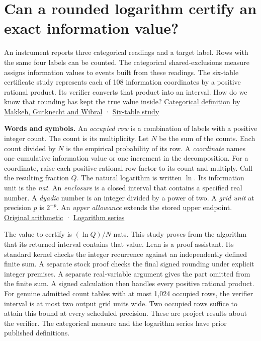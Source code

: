 \section{Can a rounded logarithm certify an exact information value?}\label{can-a-rounded-logarithm-certify-an-exact-information-value}

An instrument reports three categorical readings and a target label. Rows with the same four labels can be counted. The categorical shared-exclusions measure assigns information values to events built from these readings. The six-table certificate study represents each of 108 information coordinates by a positive rational product. Its verifier converts that product into an interval. How do we know that rounding has kept the true value inside? \href{https://doi.org/10.1103/PhysRevE.103.032149}{Categorical definition by Makkeh, Gutknecht and Wibral} · \href{https://github.com/sepahead/pid-rs/blob/main/audit/research/three-source-six-certificate-observations/README.md}{Six-table study}

\textbf{Words and symbols.} An \emph{occupied row} is a combination of labels with a positive integer count. The count is its multiplicity. Let \(N\) be the sum of the counts. Each count divided by \(N\) is the empirical probability of its row. A \emph{coordinate} names one cumulative information value or one increment in the decomposition. For a coordinate, raise each positive rational row factor to its count and multiply. Call the resulting fraction \(Q\). The natural logarithm is written \(\ln\). Its information unit is the \emph{nat}. An \emph{enclosure} is a closed interval that contains a specified real number. A \emph{dyadic} number is an integer divided by a power of two. A \emph{grid unit} at precision \(p\) is \(2^{-p}\). An \emph{upper allowance} extends the stored upper endpoint. \href{https://github.com/sepahead/pid-rs/blob/main/audit/research/three-source-six-certificate-observations/arithmetic.py}{Original arithmetic} · \href{https://dlmf.nist.gov/4.6.E4}{Logarithm series}

The value to certify is \((\ln Q)/N\) nats. This study proves from the algorithm that its returned interval contains that value. Lean is a proof assistant. Its standard kernel checks the integer recurrence against an independently defined finite sum. A separate stock proof checks the final signed rounding under explicit integer premises. A separate real-variable argument gives the part omitted from the finite sum. A signed calculation then handles every positive rational product. For genuine admitted count tables with at most 1,024 occupied rows, the verifier interval is at most two output grid units wide. Two occupied rows suffice to attain this bound at every scheduled precision. These are project results about the verifier. The categorical measure and the logarithm series have prior published definitions.

